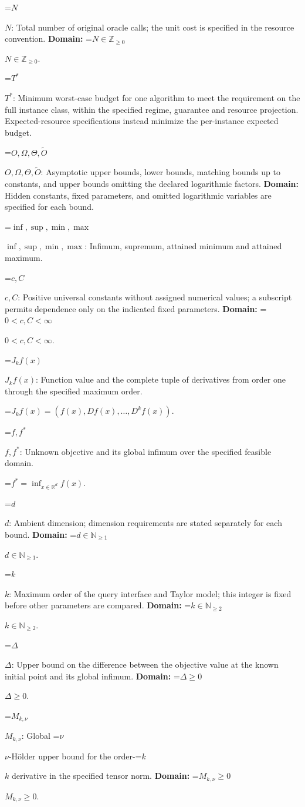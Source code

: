 \documentclass[10pt,a4paper]{article}
\newcommand{\AtlasMath}[1]{\par\begingroup\centering\setbox0=\hbox{$\displaystyle #1$}\ifdim\wd0>1.4\linewidth\typeout{ATLAS WIDE FORMULA: \the\wd0}\fi\ifdim\wd0>\linewidth\resizebox{\linewidth}{!}{\box0}\else\box0\fi\par\endgroup}
\newcommand{\AtlasInlineMath}[1]{\begingroup\setbox0=\hbox{$#1$}\ifdim\wd0>.4\linewidth\endgroup\AtlasMath{#1}\else\endgroup$#1$\fi}
\begin{document}
\AtlasInlineMath{N}: Total number of original oracle calls; the unit cost is specified in the resource convention. \textbf{Domain:} \AtlasInlineMath{N\in\mathbb{Z}_{\ge0}}.

\AtlasInlineMath{T^*}: Minimum worst-case budget for one algorithm to meet the requirement on the full instance class, within the specified regime, guarantee and resource projection. Expected-resource specifications instead minimize the per-instance expected budget.

\AtlasInlineMath{O,\Omega,\Theta,\widetilde{O}}: Asymptotic upper bounds, lower bounds, matching bounds up to constants, and upper bounds omitting the declared logarithmic factors. \textbf{Domain:} Hidden constants, fixed parameters, and omitted logarithmic variables are specified for each bound.

\AtlasInlineMath{\inf,\sup,\min,\max}: Infimum, supremum, attained minimum and attained maximum.

\AtlasInlineMath{c,C}: Positive universal constants without assigned numerical values; a subscript permits dependence only on the indicated fixed parameters. \textbf{Domain:} \AtlasInlineMath{0<c,C<\infty}.

\AtlasInlineMath{J_{k}f(x)}: Function value and the complete tuple of derivatives from order one through the specified maximum order.


\AtlasMath{J_{k}f(x)=(f(x),Df(x),\ldots,D^{k}f(x)).}


\AtlasInlineMath{f,f^*}: Unknown objective and its global infimum over the specified feasible domain.


\AtlasMath{f^*=\inf_{x\in \mathbb{R}^d}f(x).}


\AtlasInlineMath{d}: Ambient dimension; dimension requirements are stated separately for each bound. \textbf{Domain:} \AtlasInlineMath{d\in\mathbb{N}_{\ge1}}.

\AtlasInlineMath{k}: Maximum order of the query interface and Taylor model; this integer is fixed before other parameters are compared. \textbf{Domain:} \AtlasInlineMath{k\in\mathbb{N}_{\ge2}}.

\AtlasInlineMath{\Delta}: Upper bound on the difference between the objective value at the known initial point and its global infimum. \textbf{Domain:} \AtlasInlineMath{\Delta\ge0}.

\AtlasInlineMath{M_{k,\nu}}: Global \AtlasInlineMath{\nu}-Hölder upper bound for the order-\AtlasInlineMath{k} derivative in the specified tensor norm. \textbf{Domain:} \AtlasInlineMath{M_{k,\nu}\ge0}.
\end{document}
